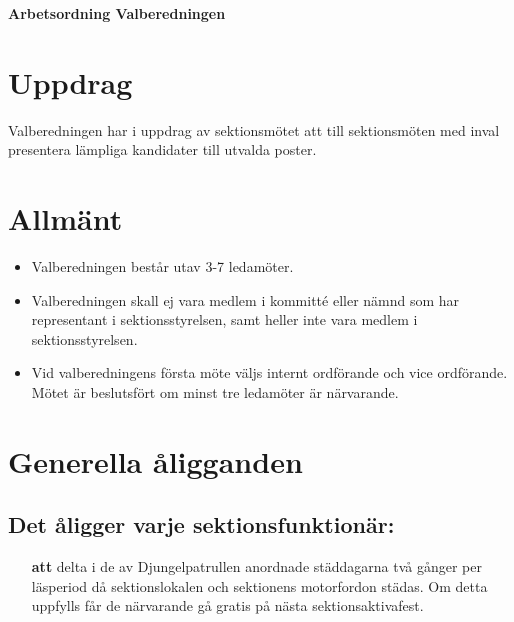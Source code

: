 \renewcommand{\dateseparator}{-} %

\renewcommand{\forening}{Valberedningen }

\begin{center}
\LARGE{\textbf{Arbetsordning Valberedningen}}
\end{center}

\section{Uppdrag}
Valberedningen har i uppdrag av sektionsmötet att till sektionsmöten med inval presentera lämpliga kandidater till utvalda poster.

\section{Allmänt}

\begin{itemize}

\item Valberedningen består utav 3-7 ledamöter.

\item Valberedningen skall ej vara medlem i kommitté eller nämnd som har representant i sektionsstyrelsen, samt heller inte vara medlem i sektionsstyrelsen.

\item Vid valberedningens första möte väljs internt ordförande och vice ordförande. Mötet är beslutsfört om minst tre ledamöter är närvarande.

\end{itemize}

\section{Generella åligganden}

\subsection{Det åligger varje sektionsfunktionär:}

\begin{itemize}

\item[\textbf{att}] delta i de av Djungelpatrullen anordnade städdagarna två gånger per läsperiod då sektionslokalen och sektionens motorfordon städas. Om detta uppfylls får de närvarande gå gratis på nästa sektionsaktivafest.

\end{itemize}

